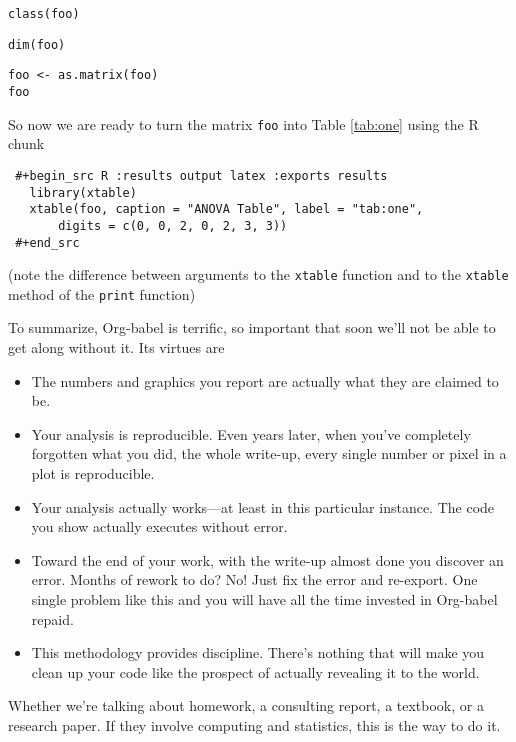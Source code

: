 \documentclass[11pt]{article}
\begin{document}
\begin{verbatim}
class(foo)
\end{verbatim}


\begin{verbatim}
dim(foo)
\end{verbatim}


\begin{verbatim}
foo <- as.matrix(foo)
foo
\end{verbatim}

So now we are ready to turn the matrix \texttt{foo} into Table \ref{tab:one}
using the R chunk
\begin{verbatim}
 #+begin_src R :results output latex :exports results
   library(xtable)
   xtable(foo, caption = "ANOVA Table", label = "tab:one",
       digits = c(0, 0, 2, 0, 2, 3, 3))
 #+end_src
\end{verbatim}

(note the difference between arguments to the \texttt{xtable} function and to
the \texttt{xtable} method of the \texttt{print} function)

To summarize, Org-babel is terrific, so important that soon we'll not
be able to get along without it.  Its virtues are
\begin{itemize}
\item The numbers and graphics you report are actually what they
  are claimed to be.
\item Your analysis is reproducible.  Even years later, when you've
  completely forgotten what you did, the whole write-up, every single
  number or pixel in a plot is reproducible.
\item Your analysis actually works---at least in this particular instance.
  The code you show actually executes without error.
\item Toward the end of your work, with the write-up almost done you
  discover an error.  Months of rework to do?  No!  Just fix the error
  and re-export.  One single problem like this and you will have all
  the time invested in Org-babel repaid.
\item This methodology provides discipline.  There's nothing that will make
  you clean up your code like the prospect of actually revealing it to
  the world.
\end{itemize}

Whether we're talking about homework, a consulting report, a textbook,
or a research paper.  If they involve computing and statistics, this
is the way to do it.
\end{document}
